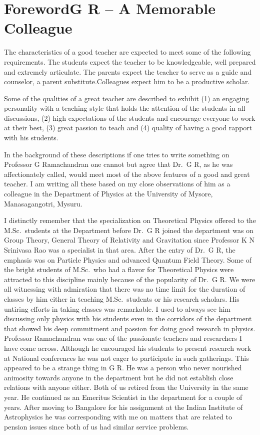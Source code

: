 \chapter[Foreword]{Foreword\break G R – A Memorable Colleague}


The characteristics of a good teacher are expected to meet some of the following requirements. The students expect the teacher to be knowledgeable, well prepared and extremely articulate. The parents expect the teacher to serve as a guide and counselor, a parent substitute.\break Colleagues expect him to be a productive scholar.

Some of the qualities of a great teacher are described to exhibit (1) an engaging personality with a teaching style that holds the attention of the students in all discussions, (2) high expectations of the students and encourage everyone to work at their best, (3) great  passion to teach and  (4) quality of having a good rapport with his students.

In the background of these descriptions if one tries to write something on Professor G Ramachandran one cannot but agree that Dr.\ G R, as he was affectionately called, would meet most of the above features of a good and great teacher. I am writing all these based on my close observations of him as a colleague in the Department of Physics at the University of Mysore, Manasagangotri, Mysuru.

I distinctly remember that the specialization on Theoretical Physics offered to the M.Sc.\ students at the Department before Dr.\ G R joined the department was on Group Theory, General Theory of Relativity and Gravitation since Professor K N Srinivasa Rao was a specialist in that area. After the entry of Dr.\ G R, the emphasis was on Particle Physics and advanced Quantum Field Theory. Some of the bright students of
 M.Sc.\ who had a flavor for Theoretical Physics were attracted to this discipline mainly because of the popularity of Dr.\ G R. We were all witnessing with admiration that there was no time limit for the duration of classes by him either in teaching M.Sc.\ students or his research scholars. His untiring efforts in taking classes was remarkable. I used to always see him discussing only physics with his students even in the corridors of the department that showed his deep commitment and passion for doing good research in physics.  Professor Ramachandran was one of the passionate teachers and researchers I have come across. Although he encouraged his students to present research work at National conferences he was not eager to participate in such gatherings. This appeared to be a strange thing in G R.  He was a person who never nourished animosity towards anyone in the department but he did not establish close relations with anyone either. Both of us retired from the University in the same year. He continued as an Emeritus Scientist in the department for a couple of years. After moving to Bangalore for his assignment at the Indian Institute of Astrophysics he was corresponding with me on matters that are related to pension issues since both of us had similar service problems.

